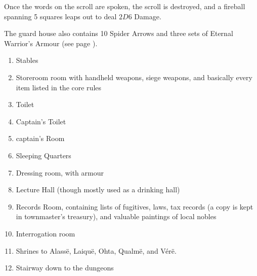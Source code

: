 \begin{multicols}{2}


Once the words on the scroll are spoken, the scroll is destroyed, and a fireball spanning 5 squares leaps out to deal $2D6$ Damage.

The guard house also contains 10 Spider Arrows and three sets of Eternal Warrior's Armour (see page \pageref{eternalwarriorarmour}).


\begin{enumerate}

  \item
  Stables\label{stationStables}
  \item
  Storeroom room with handheld weapons, siege weapons, and basically every item listed in the core rules
  \label{stationStorage}
  \item
  Toilet
  \label{stationToilet}
  \item
  Captain's Toilet
  \label{stationCaptainToilet}
  \item
  \gls{captain}'s Room
  \label{stationCaptainRoom}
  \item
  Sleeping Quarters
  \label{stationSleep}
  \item
  Dressing room, with armour
  \label{stationDressing}
  \item
  Lecture Hall (though mostly used as a drinking hall)
  \label{stationLecture}
  \item
  Records Room, containing lists of fugitives, laws, tax records (a copy is kept in \gls{townmaster}'s treasury), and valuable paintings of local nobles
  \label{stationRecords}
  \item
  Interrogation room
  \label{stationInterrogation}
  \item
  Shrines to Alass\"{e}, Laiqu\"{e}, Ohta, Qualm\"{e}, and V\'{e}r\"{e}.
  \label{stationShrine}
  \item
  Stairway down to the dungeons
  \label{stationStairs}
\end{enumerate}


\end{multicols}
